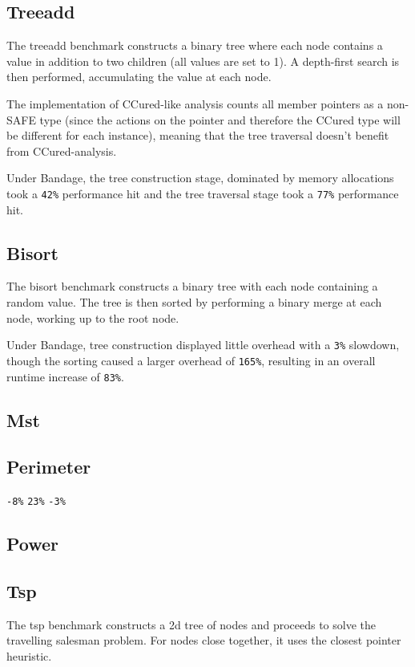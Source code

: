 \subsection{Treeadd}

The treeadd benchmark constructs a binary tree where each node contains a value in addition to two children (all values are set to 1).
A depth-first search is then performed, accumulating the value at each node.

The implementation of CCured-like analysis counts all member pointers as a non-SAFE type (since the actions on the pointer and therefore the CCured type will be different for each instance), meaning that the tree traversal doesn't benefit from CCured-analysis.

Under Bandage, the tree construction stage, dominated by memory allocations took a \verb!42%! performance hit and the tree traversal stage took a \verb!77%! performance hit.


\subsection{Bisort}

The bisort benchmark constructs a binary tree with each node containing a random value.
The tree is then sorted by performing a binary merge at each node, working up to the root node.

Under Bandage, tree construction displayed little overhead with a \verb!3%! slowdown, though the sorting caused a larger overhead of \verb!165%!, resulting in an overall runtime increase of \verb!83%!.

\subsection{Mst}
\subsection{Perimeter}
\verb!-8%!
\verb!23%!
\verb!-3%!
\subsection{Power}
\subsection{Tsp}

The tsp benchmark constructs a 2d tree of nodes and proceeds to solve the travelling salesman problem.
For nodes close together, it uses the closest pointer heuristic.

